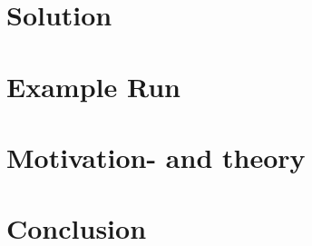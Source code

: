 \section{Solution}
\label{MutualExclusion_solution}

\section{Example Run}
\label{MutualExclusion_run}

\section{Motivation- and theory}
\label{MutualExclusion_motivation}

\section{Conclusion}
\label{MutualExclusion_conclusion}